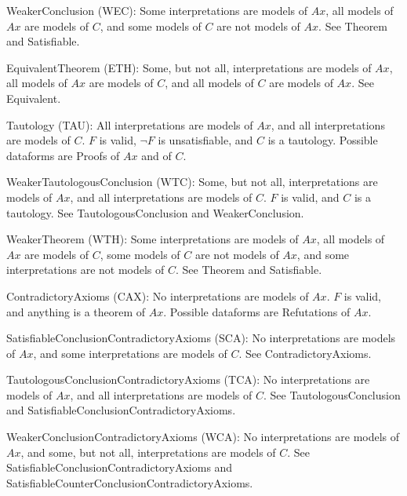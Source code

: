 \documentclass[a4paper]{easychair}
\newenvironment{packed_itemize}{
\vspace*{-0.5em}
\begin{itemize}
  \setlength{\partopsep}{0pt}
  \setlength{\itemsep}{1pt}
  \setlength{\parskip}{0pt}
  \setlength{\parsep}{0pt}
}{\end{itemize}}
\begin{document}
\begin{packed_itemize}
\item WeakerConclusion (WEC):
      Some interpretations are models of $Ax$,
      all models of $Ax$ are models of $C$, and
      some models of $C$ are not models of $Ax$.
      See Theorem and Satisfiable.

\item EquivalentTheorem (ETH):
      Some, but not all, interpretations are models of $Ax$,
      all models of $Ax$ are models of $C$, and
      all models of $C$ are models of $Ax$.
      See Equivalent.

\item Tautology (TAU):
      All interpretations are models of $Ax$, and
      all interpretations are models of $C$.
      $F$ is valid, $\neg F$ is unsatisfiable, and $C$ is a tautology.
      Possible dataforms are Proofs of $Ax$ and of $C$.

\item WeakerTautologousConclusion (WTC):
      Some, but not all, interpretations are models of $Ax$, and
      all interpretations are models of $C$.
      $F$ is valid, and $C$ is a tautology.
      See TautologousConclusion and WeakerConclusion.

\item WeakerTheorem (WTH):
      Some interpretations are models of $Ax$,
      all models of $Ax$ are models of $C$,
      some models of $C$ are not models of $Ax$, and
      some interpretations are not models of $C$.
      See Theorem and Satisfiable.

\item ContradictoryAxioms (CAX):
      No interpretations are models of $Ax$.
      $F$ is valid, and anything is a theorem of $Ax$.
      Possible dataforms are Refutations of $Ax$.

\item SatisfiableConclusionContradictoryAxioms (SCA):
      No interpretations are models of $Ax$, and
      some interpretations are models of $C$.
      See ContradictoryAxioms.

\item TautologousConclusionContradictoryAxioms (TCA):
      No interpretations are models of $Ax$, and
      all interpretations are models of $C$.
      See TautologousConclusion and SatisfiableConclusionContradictoryAxioms.

\item WeakerConclusionContradictoryAxioms (WCA):
      No interpretations are models of $Ax$, and
      some, but not all, interpretations are models of $C$.
      See SatisfiableConclusionContradictoryAxioms and 
      SatisfiableCounterConclusionContradictoryAxioms.


\end{packed_itemize}
\end{document}
